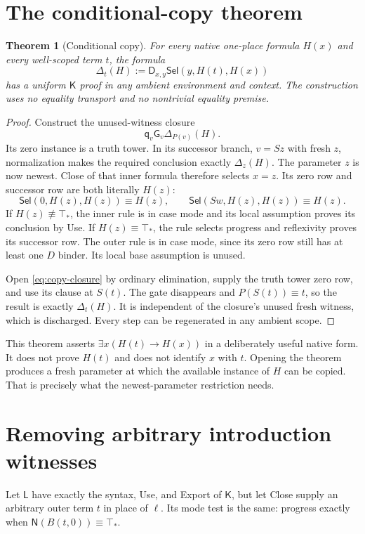 \documentclass[11pt,letterpaper]{article}
\newtheorem{theorem}{Theorem}[section]
\theoremstyle{definition}\newtheorem{definition}[theorem]{Definition}
\theoremstyle{remark}\newtheorem{remark}[theorem]{Remark}
\newcommand{\K}{\mathsf K}
\newcommand{\Liberal}{\mathsf L}
\newcommand{\NF}{\mathsf N}
\newcommand{\DD}{\mathsf D}
\newcommand{\qq}{\mathsf q}
\newcommand{\GG}{\mathsf G}
\newcommand{\Sel}{\mathsf{Sel}}
\newcommand{\ttop}{\top_*}
\begin{document}
\section{The conditional-copy theorem}\label{sec:copy}
\begin{theorem}[Conditional copy]\label{thm:copy}
For every native one-place formula $H(x)$ and every well-scoped term $t$,
the formula
\[
             \Delta_t(H):=\DD_{x,y}\Sel(y,H(t),H(x))
\]
has a uniform $\K$ proof in any ambient environment and context. The
construction uses no equality transport and no nontrivial equality
premise.
\end{theorem}
\begin{proof}
Construct the unused-witness closure
\begin{equation}\label{eq:copy-closure}
                    \qq_v\GG_v\Delta_{P(v)}(H).
\end{equation}
Its zero instance is a truth tower. In its successor branch, $v=Sz$
with fresh $z$, normalization makes the required conclusion exactly
$\Delta_z(H)$. The parameter $z$ is now newest. Close of that inner
formula therefore selects $x=z$. Its zero row and successor row are
both literally $H(z)$:
\[
 \Sel(0,H(z),H(z))\equiv H(z),\qquad
 \Sel(Sw,H(z),H(z))\equiv H(z).
\]
If $H(z)\not\equiv\ttop$, the inner rule is in case mode and its
local assumption proves its conclusion by Use. If $H(z)\equiv\ttop$,
the rule selects progress and reflexivity proves its successor row.
The outer rule is in case mode, since its zero row still has at least
one $D$ binder. Its local base assumption is unused.

Open \eqref{eq:copy-closure} by ordinary elimination, supply the truth
tower zero row, and use its clause at $S(t)$. The gate disappears and
$P(S(t))\equiv t$, so the result is exactly $\Delta_t(H)$. It is
independent of the closure's unused fresh witness, which is discharged.
Every step can be regenerated in any ambient scope.
\end{proof}

This theorem asserts $\exists x(H(t)\to H(x))$ in a deliberately useful
native form. It does not prove $H(t)$ and does not identify $x$ with $t$.
Opening the theorem produces a fresh parameter at which the available
instance of $H$ can be copied. That is precisely what the newest-parameter
restriction needs.

\section{Removing arbitrary introduction witnesses}\label{sec:restriction}
Let $\Liberal$ have exactly the syntax, Use, and Export of $\K$, but let
Close supply an arbitrary outer term $t$ in place of $\ell$. Its mode
test is the same: progress exactly when $\NF(B(t,0))\equiv\ttop$.
\end{document}
